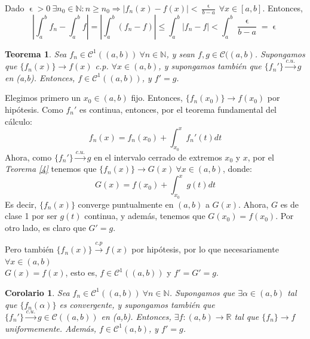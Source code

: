 \documentclass[11pt, a4paper]{article}
\makeatletter
\newif\IfInSansMode
\let\oldsf\sffamily
\renewcommand*{\sffamily}{\oldsf\mathversion{sans}\InSansModetrue}
\let\oldnorm\normalfont
\renewcommand*{\normalfont}{\oldnorm\InSansModefalse\mathversion{normal}}
\let\epsilon\upvarepsilon
\newcommand{\fn}{\{f_n\}}
\renewenvironment{proof}[1][\proofname] {\par\pushQED{\qed}\normalfont\topsep6\p@\@plus6\p@\relax\trivlist\item[\hskip\labelsep\itshape\sffamily#1\@addpunct{.}]\ignorespaces}{\popQED\endtrivlist\@endpefalse}
\theoremstyle{theorem-style}
\newtheorem{nth}{Teorema}[section]
\newtheorem{ncor}{Corolario}[section]
\theoremstyle{definition-style}
\theoremstyle{remark-style}
\theoremstyle{example-style}
\makeatother
\begin{document}
  \begin{proof} Dado $\displaystyle \epsilon >0\ \exists n_0 \in \mathbb{N}: n \ge n_0 \Rightarrow |f_n(x)-f(x)| < \frac{\epsilon}{b-a}\ \forall x \in [a,b]$. Entonces, $$\left| \int_a^b f_n - \int _a^b f \right| = \left| \int_a^b (f_n - f) \right| \le \int_a^b |f_n - f| < \int_a^b \frac{\epsilon}{b-a} = \epsilon$$
  \end{proof}

\begin{nth} \label{5}
  Sea $f_n\in \mathcal{C}^1((a,b)) \ \forall n \in \mathbb{N}$, y sean $f,g \in \mathcal{C}((a,b)$. Supongamos que $ \{f_n(x)\} \to f(x)$ c.p. $\forall x \in (a,b)$, y supongamos también que $\{f_n'\} \xrightarrow{c.u.} g $ en (a,b). Entonces, $f \in \mathcal{C}^1((a,b))$, y $f' = g$.
\end{nth}

  \begin{proof}
    Elegimos primero un $x_0 \in (a,b)$ fijo. Entonces, $\{f_n(x_0)\} \to f(x_0)$ por hipótesis.
    Como $f_n'$ es continua, entonces, por el teorema fundamental del cálculo:
    \[
      f_n(x) = f_n(x_0) + \int_{x_0}^x f_n'(t)dt
    \]
    Ahora, como  $\{f_n'\} \xrightarrow{c.u.} g $ en el intervalo cerrado de extremos $x_0$ y $x$, por el \textit{Teorema \ref{4}} tenemos que $\{f_n(x)\} \to G(x)\ \forall x \in (a,b)$, donde:
    \[
      G(x) = f(x_0) + \int_{x_0}^x g(t)dt
    \]
    Es decir, $\{f_n(x)\}$ converge puntualmente en $(a,b)$ a $G(x)$. Ahora, $G$ es de clase 1 por ser $g(t)$ continua, y además, tenemos que $G(x_0) = f(x_0)$.
    Por otro lado, es claro que $G' = g$.
    
    Pero también $\{f_n(x)\} \xrightarrow {c.p} f(x)$ por hipótesis, por lo que necesariamente $\forall x \in (a,b)$ \\ $G(x) = f(x)$, esto es, $f \in \mathcal{C}^1((a,b))$ y $f' = G' = g$.
  \end{proof}

\begin{ncor}
  Sea $f_n\in \mathcal{C}^1((a,b)) \ \forall n \in \mathbb{N}$. Supongamos que $\exists \alpha \in (a,b)$ tal que $ \{f_n(\alpha)\}$ es convergente, y supongamos también que $\{f_n'\} \xrightarrow{c.u.} g \in \mathcal C((a,b))$ en (a,b). Entonces, $\exists f: (a,b) \to \mathbb{R}$ tal que $\fn \to f$ uniformemente. Además, $f \in \mathcal{C}^1(a,b)$, y  $f' = g$.
\end{ncor}
\end{document}
